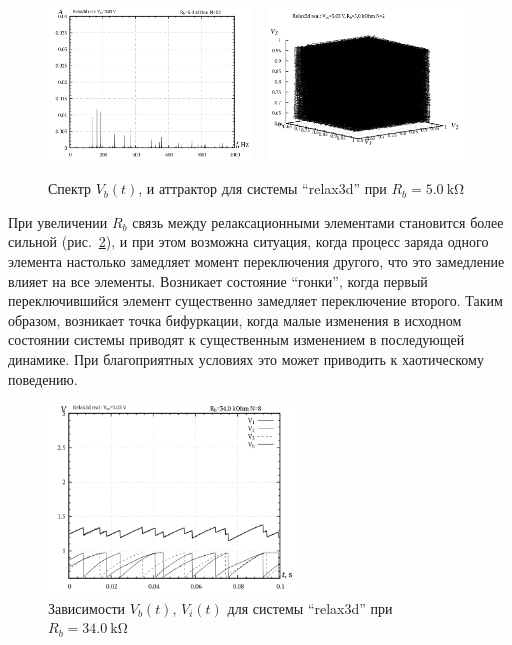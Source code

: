 \begin{figure}[htb!]
  \centerline{
    \includegraphics[width=0.48\textwidth]{p/relax3d_f_02.png}
    ~
    \includegraphics[width=0.48\textwidth]{p/relax3d_v1v2v3_02.png}
  }
  \caption{Спектр $V_b(t)$, и аттрактор для системы ``relax3d'' при $R_b=\SI{5.0}{\kilo\ohm}$ }
  \label{atu:f:relax3d_f_02}
\end{figure}

При увеличении $R_b$ связь между релаксационными элементами становится более сильной
(рис.~\ref{atu:f:relax3d_t_08}), и при этом возможна ситуация, когда
процесс заряда одного элемента настолько замедляет момент переключения другого,
что это замедление влияет на все элементы. Возникает состояние ``гонки'',
когда первый переключившийся элемент существенно замедляет переключение второго.
Таким образом, возникает точка бифуркации, когда малые изменения
в исходном состоянии системы приводят к существенным изменением в последующей динамике.
При благоприятных условиях это может приводить к хаотическому поведению.


\begin{figure}[htb!]
  \centerline{\includegraphics[width=0.6\textwidth]{p/relax3d_t_08.png} }
  \caption{Зависимости $V_b(t)$, $V_i(t)$ для системы ``relax3d'' при $R_b=\SI{34.0}{\kilo\ohm}$ }
  \label{atu:f:relax3d_t_08}
\end{figure}

